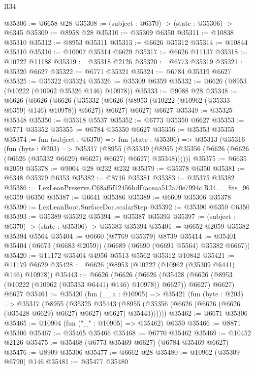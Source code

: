 \begin{lexlean}{R34}
\begin{coremodule}
@35306 := @6658 @28
@35308 := (subject : @6370) -> (state : @35306) -> @6345
@35309 := @8958 @28
@35310 := @35309 @6350
@35311 := @10838 @35310
@35312 := @8953 @35311
@35313 := @6626 @35312
@35314 := @10844 @35310
@35316 := @10907 @35314 @6629
@35317 := @6626 @11137
@35318 := @10222 @11188
@35319 := @35318 @2126
@35320 := @6773 @35319
@35321 := @35320 @6627
@35322 := @6771 @35321
@35324 := @6784 @35319 @6627
@35325 := @35322 @35324
@35326 := @35309 @6359
@35332 := @6626 (@8953 (@10222 (@10962 @35326 @146) @10978))
@35333 := @9088 @28
@35348 := @6626
    (@6626
      (@6626 (@35332 (@6626 (@8953 (@10222 (@10962 (@35333 @6359) @146) @10978)) @6627)) @6627)
      @6627)
    @6627
@35349 := @35325 @35348
@35350 := @35318 @5537
@35352 := @6773 @35350 @6627
@35353 := @6771 @35352
@35355 := @6784 @35350 @6627
@35356 := @35353 @35355
@35374 := fun (subject : @6370) =>
  fun (state : @35306) =>
  @35313
    (@35316
      (fun (byte : @203) =>
      @35317
        (@8955
          (@35349
            (@8955 (@35356 (@6626 (@6626 (@6626 (@35332 @6629) @6627) @6627) @6627) @35348))))))
@35375 := @6635 @2059
@35378 := @9004 @28 @232 @232
@35379 := @35378 @6350
@35381 := @6348 @35379 @6353
@35382 := @8716 @35381
@35383 := @35375 @35382
@35386 := LexLeanPreserve.C68af5f12456bdf7aceaa512a70e7994c.R34.__fits_96 @6359 @6350
@35387 := @6641 @35386
@35389 := @6609 @35306 @35378
@35390 := LexLeanBoot.SurfaceDoc.scalarStep
@35392 := @35390 @6359 @6350
@35393 := @35389 @35392
@35394 := @35387 @35393
@35397 := (subject : @6370) -> (state : @35306) -> @35383 @35394
@35401 := @6652 @2059 @35382 @35394 @5564
@35404 := @6660 (@7769 @35379) @8739
@35414 := @35401 @35404 (@6673 (@6683 @2059)) (@6689 (@6690 (@6691 @5564) @35382 @6667))
@35420 := @11172 @35404 @4956 @5513 @5562 @35312 @10842
@35421 := @11179 @6629
@35428 := @6626 (@8953 (@10222 (@10962 (@35309 @6441) @146) @10978))
@35443 := @6626
    (@6626
      (@6626 (@35428 (@6626 (@8953 (@10222 (@10962 (@35333 @6441) @146) @10978)) @6627)) @6627)
      @6627)
    @6627
@35461 := @35420
    (fun (__a : @10905) =>
    @35421
      (fun (byte : @203) =>
      @35317
        (@8955
          (@35325
            @35443
            (@8955 (@35356 (@6626 (@6626 (@6626 (@35428 @6629) @6627) @6627) @6627) @35443))))))
@35462 := @6671 @35306
@35465 := @10904 (fun ("_" : @10905) => @35462) @6350
@35466 := @8871 @35306
@35467 := @35465 @35466
@35468 := @6770 @35462
@35469 := @10452 @2126
@35475 := @35468 (@6773 @35469 @6627) (@6784 @35469 @6627)
@35476 := @8909 @35306
@35477 := @6662 @28
@35480 := @10962 (@35309 @6790) @146
@35481 := @35477 @35480

\end{coremodule}
\end{lexlean}
